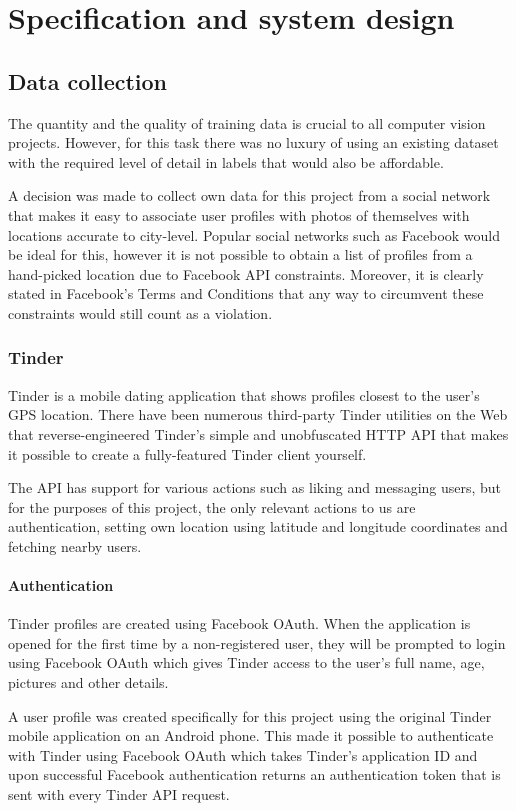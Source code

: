 \chapter{Specification and system design}
\label{spec}
\section{Data collection}
The quantity and the quality of training data is crucial to all computer vision projects. 
However, for this task there was no luxury of using an existing dataset with 
the required level of detail in labels that would also be affordable.

A decision was made to collect own data for this project from a social network that 
makes it easy to associate user profiles with photos of themselves with locations accurate to city-level.
Popular social networks such as Facebook would be ideal for this, however it is not possible to obtain 
a list of profiles from a hand-picked location due to Facebook API constraints. Moreover, it is clearly 
stated in Facebook's Terms and Conditions that any way to circumvent these constraints would still count as a violation.


\subsection{Tinder}
Tinder is a mobile dating application that shows profiles closest to the user's GPS location. 
There have been numerous third-party Tinder utilities on the Web that reverse-engineered Tinder's simple 
and unobfuscated HTTP API that makes it possible to create a fully-featured Tinder client yourself.

The API has support for various actions such as liking and messaging users, but for the purposes of this project, 
the only relevant actions to us are authentication, setting own location using 
latitude and longitude coordinates and fetching nearby users.

\subsubsection{Authentication}
Tinder profiles are created using Facebook OAuth. When the application is opened for the first time by a non-registered user,
they will be prompted to login using Facebook OAuth which gives Tinder access to the user's full name, age, pictures and other details.

A user profile was created specifically for this project using the original Tinder mobile application on an Android phone. 
This made it possible to authenticate with Tinder using Facebook OAuth which takes Tinder's 
application ID and upon successful Facebook authentication returns an authentication token that is sent with every Tinder API request.


